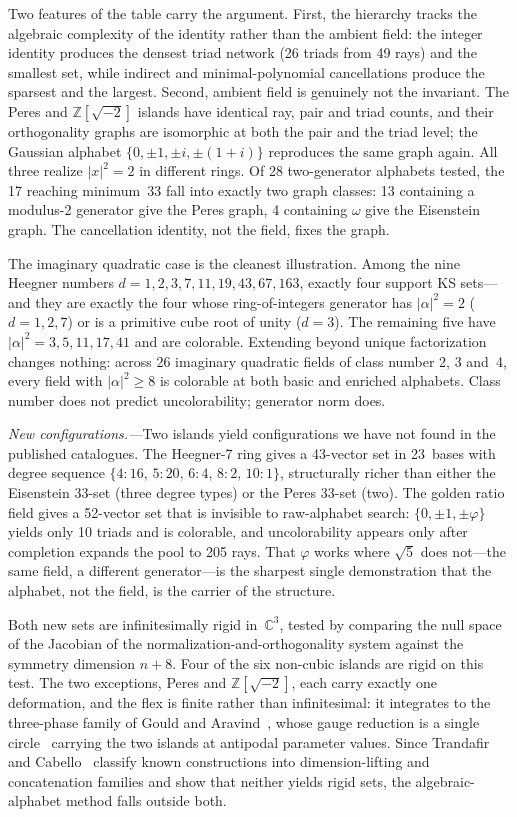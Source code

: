 \documentclass[twocolumn,prl,superscriptaddress,nofootinbib]{revtex4-2}
\newcommand{\C}{\mathbb{C}}
\newcommand{\Z}{\mathbb{Z}}
\begin{document}
Two features of the table carry the argument.  First, the hierarchy tracks the
algebraic complexity of the identity rather than the ambient field: the integer
identity produces the densest triad network (26 triads from 49 rays) and the
smallest set, while indirect and minimal-polynomial cancellations produce the
sparsest and the largest.  Second, ambient field is genuinely not the invariant.
The Peres and $\Z[\sqrt{-2}]$ islands have identical ray, pair and triad counts,
and their orthogonality graphs are isomorphic at both the pair and the triad
level; the Gaussian alphabet $\{0,\pm1,\pm i,\pm(1{+}i)\}$ reproduces the same
graph again.  All three realize $|x|^2=2$ in different rings.  Of 28 two-generator
alphabets tested, the 17 reaching minimum~33 fall into exactly two graph classes:
13 containing a modulus-2 generator give the Peres graph, 4 containing $\omega$
give the Eisenstein graph.  The cancellation identity, not the field, fixes the
graph.

The imaginary quadratic case is the cleanest illustration.  Among the nine
Heegner numbers $d=1,2,3,7,11,19,43,67,163$, exactly four support KS sets---and
they are exactly the four whose ring-of-integers generator has
$|\alpha|^2=2$ ($d=1,2,7$) or is a primitive cube root of unity ($d=3$).  The
remaining five have $|\alpha|^2 = 3,5,11,17,41$ and are colorable.  Extending
beyond unique factorization changes nothing: across 26 imaginary quadratic fields
of class number 2, 3 and~4, every field with $|\alpha|^2 \geq 8$ is colorable at
both basic and enriched alphabets.  Class number does not predict uncolorability;
generator norm does.

\textit{New configurations.---}Two islands yield configurations we have not found
in the published catalogues.  The Heegner-7 ring gives a 43-vector set in
23~bases with degree sequence $\{4{:}16,\,5{:}20,\,6{:}4,\,8{:}2,\,10{:}1\}$,
structurally richer than either the Eisenstein 33-set (three degree types) or the
Peres 33-set (two).  The golden ratio field gives a 52-vector set that is
invisible to raw-alphabet search: $\{0,\pm1,\pm\varphi\}$ yields only 10 triads
and is colorable, and uncolorability appears only after completion expands the
pool to 205 rays.  That $\varphi$ works where $\sqrt5$ does not---the same field,
a different generator---is the sharpest single demonstration that the alphabet,
not the field, is the carrier of the structure.

Both new sets are infinitesimally rigid in~$\C^3$, tested by comparing the null
space of the Jacobian of the normalization-and-orthogonality system against the
symmetry dimension $n+8$.  Four of the six non-cubic islands are rigid on this
test.  The two exceptions, Peres and $\Z[\sqrt{-2}]$, each carry exactly one
deformation, and the flex is finite rather than infinitesimal: it integrates to
the three-phase family of Gould and Aravind~\cite{GouldAravind2010}, whose gauge
reduction is a single circle~\cite{FloresGordillo2026} carrying the two islands at
antipodal parameter values.  Since Trandafir and Cabello~\cite{TrandafirCabello2025}
classify known constructions into dimension-lifting and concatenation families and
show that neither yields rigid sets, the algebraic-alphabet method falls outside
both.
\end{document}
